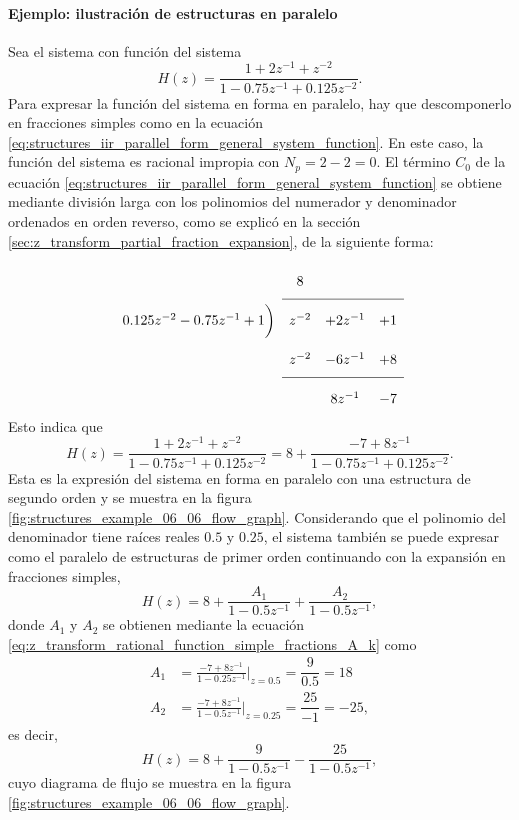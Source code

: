 \documentclass[a4paper]{report}
\begin{document}
\paragraph{Ejemplo: ilustración de estructuras en paralelo} Sea el sistema con función del sistema
\[
 H(z)=\dfrac{1+2z^{-1}+z^{-2}}{1-0.75z^{-1}+0.125z^{-2}}.
\]
Para expresar la función del sistema en forma en paralelo, hay que descomponerlo en fracciones simples como en la ecuación \ref{eq:structures_iir_parallel_form_general_system_function}. En este caso, la función del sistema es racional impropia con \(N_p=2-2=0\). El término \(C_0\) de la ecuación \ref{eq:structures_iir_parallel_form_general_system_function} se obtiene mediante división larga con los polinomios del numerador y denominador ordenados en orden reverso, como se explicó en la sección \ref{sec:z_transform_partial_fraction_expansion}, de la siguiente forma:
\[
\setlength\extrarowheight{10pt}
\begin{array}[t]{cccc}
                       & 8 &   &    \\[\medskipamount]
\cline{2-4}
0.125z^{-2}-0.75z^{-1}+1 
                \bigg) & z^{-2} & +2z^{-1} & +1 \\
                       & z^{-2} & -6z^{-1} & +8  \\[\medskipamount]
\cline{2-4}
                       &    & 8z^{-1} & -7  
\end{array}
\]
Esto indica que 
\[
 H(z)=\dfrac{1+2z^{-1}+z^{-2}}{1-0.75z^{-1}+0.125z^{-2}}=8+\dfrac{-7+8z^{-1}}{1-0.75z^{-1}+0.125z^{-2}}.
\]
Esta es la expresión del sistema en forma en paralelo con una estructura de segundo orden y se muestra en la figura \ref{fig:structures_example_06_06_flow_graph}. Considerando que el polinomio del denominador tiene raíces reales \(0.5\) y \(0.25\), el sistema también se puede expresar como el paralelo de estructuras de primer orden continuando con la expansión en fracciones simples,
\[
 H(z)=8+\dfrac{A_1}{1-0.5z^{-1}}+\dfrac{A_2}{1-0.5z^{-1}},
\]
donde \(A_1\) y \(A_2\) se obtienen mediante la ecuación \ref{eq:z_transform_rational_function_simple_fractions_A_k} como
\begin{align*}
 A_1&=\frac{-7+8z^{-1}}{1-0.25z^{-1}}\bigg|_{z=0.5}=\dfrac{9}{0.5}=18\\
 A_2&=\frac{-7+8z^{-1}}{1-0.5z^{-1}}\bigg|_{z=0.25}=\dfrac{25}{-1}=-25,
\end{align*}
es decir,
\[
 H(z)=8+\dfrac{9}{1-0.5z^{-1}}-\dfrac{25}{1-0.5z^{-1}},
\]
cuyo diagrama de flujo se muestra en la figura \ref{fig:structures_example_06_06_flow_graph}.
\end{document}
